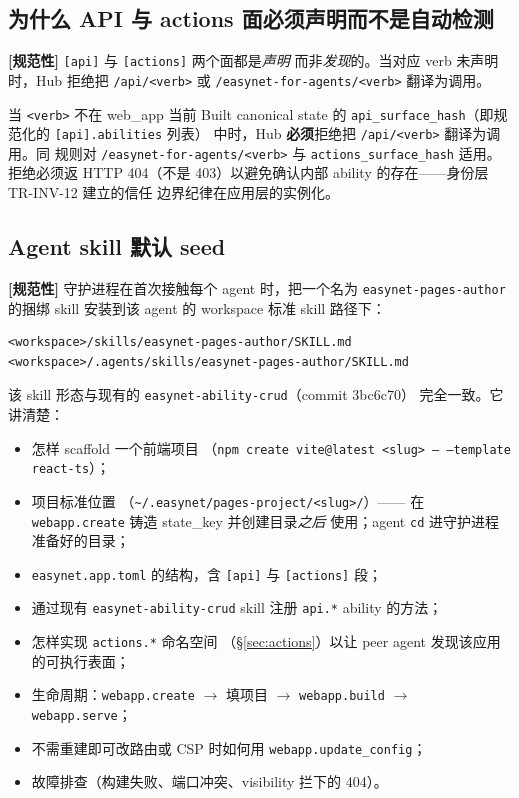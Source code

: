 \documentclass[11pt,a4paper]{article}
\newcommand{\normsv}{\textcolor{normativecolor}{\textbf{[规范性]}}\xspace}
\theoremstyle{definition}
\begin{document}
\subsection{为什么 API 与 actions 面必须声明而不是自动检测}

\normsv{} \texttt{[api]} 与 \texttt{[actions]} 两个面都是\emph{声明}
而非\emph{发现}的。当对应 verb 未声明时，Hub 拒绝把
\texttt{/api/<verb>} 或 \texttt{/easynet-for-agents/<verb>} 翻译为调用。

\begin{invariant}[WB-INV-2]
当 \texttt{<verb>} 不在 web\_app 当前 Built canonical state 的
\texttt{api\_surface\_hash}（即规范化的 \texttt{[api].abilities} 列表）
中时，Hub \textbf{必须}拒绝把 \texttt{/api/<verb>} 翻译为调用。同
规则对 \texttt{/easynet-for-agents/<verb>} 与
\texttt{actions\_surface\_hash} 适用。拒绝必须返 HTTP 404（不是
403）以避免确认内部 ability 的存在——身份层 TR-INV-12 建立的信任
边界纪律在应用层的实例化。
\end{invariant}

\subsection{Agent skill 默认 seed}
\label{sec:skill-seed}

\normsv{} 守护进程在首次接触每个 agent 时，把一个名为
\texttt{easynet-pages-author} 的捆绑 skill 安装到该 agent 的 workspace
标准 skill 路径下：

\begin{lstlisting}
<workspace>/skills/easynet-pages-author/SKILL.md
<workspace>/.agents/skills/easynet-pages-author/SKILL.md
\end{lstlisting}

该 skill 形态与现有的 \texttt{easynet-ability-crud}（commit 3bc6c70）
完全一致。它讲清楚：

\begin{itemize}[leftmargin=2em,itemsep=0.15em]
    \item 怎样 scaffold 一个前端项目
    （\texttt{npm create vite@latest <slug> -- --template react-ts}）；
    \item 项目标准位置
    （\texttt{\textasciitilde/.easynet/pages-project/<slug>/}）——
    在 \texttt{webapp.create} 铸造 state\_key 并创建目录\emph{之后}
    使用；agent \texttt{cd} 进守护进程准备好的目录；
    \item \texttt{easynet.app.toml} 的结构，含 \texttt{[api]} 与
    \texttt{[actions]} 段；
    \item 通过现有 \texttt{easynet-ability-crud} skill 注册
    \texttt{api.*} ability 的方法；
    \item 怎样实现 \texttt{actions.*} 命名空间
    （\S\ref{sec:actions}）以让 peer agent 发现该应用的可执行表面；
    \item 生命周期：\texttt{webapp.create} $\to$ 填项目 $\to$
    \texttt{webapp.build} $\to$ \texttt{webapp.serve}；
    \item 不需重建即可改路由或 CSP 时如何用
    \texttt{webapp.update\_config}；
    \item 故障排查（构建失败、端口冲突、visibility 拦下的 404）。
\end{itemize}
\end{document}
